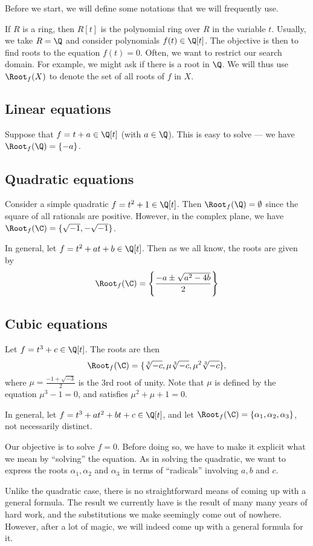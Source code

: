 \documentclass[a4paper]{article}
\begin{document}
Before we start, we will define some notations that we will frequently use.

If $R$ is a ring, then $R[t]$ is the polynomial ring over $R$ in the variable $t$. Usually, we take $R = \Q$ and consider polynomials $f(t) \in \Q[t]$. The objective is then to find roots to the equation $f(t) = 0$. Often, we want to restrict our search domain. For example, we might ask if there is a root in $\Q$. We will thus use $\Root_f(X)$ to denote the set of all roots of $f$ in $X$.

\subsection{Linear equations}
Suppose that $f = t + a \in \Q[t]$ (with $a\in \Q$). This is easy to solve --- we have $\Root_f(\Q) = \{-a\}$.

\subsection{Quadratic equations}
Consider a simple quadratic $f = t^2 + 1 \in \Q[t]$. Then $\Root_f(\Q) = \emptyset$ since the square of all rationals are positive. However, in the complex plane, we have $\Root_f(\C) = \{\sqrt{-1}, -\sqrt{-1}\}$.

In general, let $f = t^2 + at + b\in \Q[t]$. Then as we all know, the roots are given by
\[
  \Root_f(\C) = \left\{\frac{-a \pm \sqrt{a^2 - 4b}}{2}\right\}
\]
\subsection{Cubic equations}
Let $f = t^3 + c\in \Q[t]$. The roots are then
\[
  \Root_f(\C) = \{\sqrt[3]{-c}, \mu\sqrt[3]{-c}, \mu^2 \sqrt[3]{-c}\},
\]
where $\mu = \frac{-1 + \sqrt{-3}}{2}$ is the 3rd root of unity. Note that $\mu$ is defined by the equation $\mu^3 - 1 = 0$, and satisfies $\mu^2 + \mu + 1 = 0$.

In general, let $f = t^3 + at^2 + bt + c \in \Q[t]$, and let $\Root_f(\C) = \{\alpha_1, \alpha_2, \alpha_3\}$, not necessarily distinct.

Our objective is to solve $f = 0$. Before doing so, we have to make it explicit what we mean by ``solving'' the equation. As in solving the quadratic, we want to express the roots $\alpha_1, \alpha_2$ and $\alpha_3$ in terms of ``radicals'' involving $a, b$ and $c$.

Unlike the quadratic case, there is no straightforward means of coming up with a general formula. The result we currently have is the result of many many years of hard work, and the substitutions we make seemingly come out of nowhere. However, after a lot of magic, we will indeed come up with a general formula for it.
\end{document}
